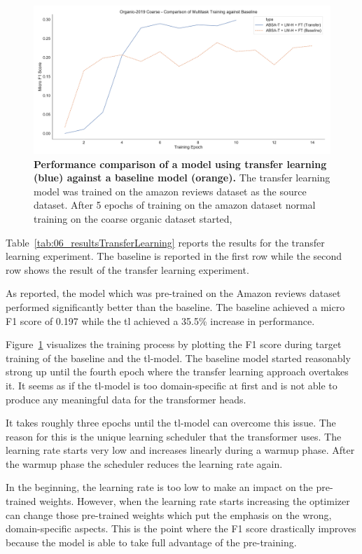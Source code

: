 \begin{figure}[htb]
    \centering
    \includegraphics[width=\textwidth]{figures/06_results/06_org_coarse_transfer}
    \caption{\textbf{Performance comparison of a model using transfer learning {(blue)} against a baseline model {(orange)}.} The transfer learning model was trained on the amazon reviews dataset as the source dataset. After 5 epochs of training on the amazon dataset normal training on the coarse organic dataset started,}
    \label{fig:06_org_coarse_transfer}
\end{figure}


Table~\ref{tab:06_resultsTransferLearning} reports the results for the transfer learning experiment. The baseline is reported in the first row while the second row shows the result of the transfer learning experiment. 
\medskip

As reported, the model which was pre-trained on the Amazon reviews dataset performed significantly better than the baseline. The baseline achieved a micro F1 score of 0.197 while the \gls{tl} achieved a 35.5\% increase in performance. 
\medskip

Figure~\ref{fig:06_org_coarse_transfer} visualizes the training process by plotting the F1 score during target training of the baseline and the \gls{tl}-model. The baseline model started reasonably strong up until the fourth epoch where the transfer learning approach overtakes it. It seems as if the \gls{tl}-model is too domain-specific at first and is not able to produce any meaningful data for the transformer heads.
\medskip

It takes roughly three epochs until the \gls{tl}-model can overcome this issue. The reason for this is the unique learning scheduler that the transformer uses. The learning rate starts very low and increases linearly during a warmup phase. After the warmup phase the scheduler reduces the learning rate again.
\medskip

In the beginning, the learning rate is too low to make an impact on the pre-trained weights. However, when the learning rate starts increasing the optimizer can change those pre-trained weights which put the emphasis on the wrong, domain-specific aspects. This is the point where the F1 score drastically improves because the model is able to take full advantage of the pre-training.